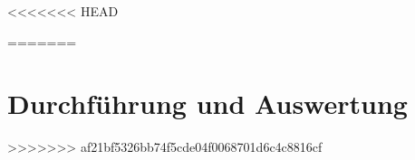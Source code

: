 \documentclass[a4paper, parskip=half]{scrartcl}
\begin{document}
\myTitlepage
\tableofcontents
\newpage

<<<<<<< HEAD
	

\newpage

	

\newpage

	

\newpage

	

\newpage

	
=======
%

\newpage

%

\newpage

%

\section{Durchführung und Auswertung}












>>>>>>> af21bf5326bb74f5cde04f0068701d6c4c8816cf
\end{document}
